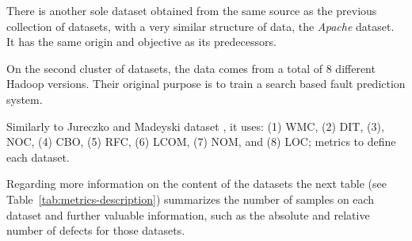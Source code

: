 There is another sole dataset obtained from the same source as the previous 
collection of datasets, with a very similar structure of data, the 
\textit{Apache} dataset. It has the same origin and objective as its 
predecessors.

On the second cluster of datasets, the data comes from a total of 8 different 
Hadoop versions. Their original purpose is to train a search based fault 
prediction system. 

Similarly to Jureczko and Madeyski dataset \cite{Jureczko2010, MadeyskiJ2015}, 
it uses: (1) WMC, (2) DIT, (3), NOC, (4) CBO, (5) RFC, (6) LCOM, (7) NOM, and 
(8) LOC; metrics to define each dataset.

Regarding more information on the content of the datasets the next table (see 
Table~\ref{tab:metrics-description}) summarizes the number of samples on each 
dataset and further valuable information, such as the absolute and relative 
number of defects for those datasets.


